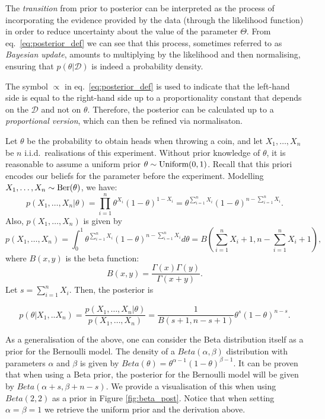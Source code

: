 The \emph{transition} from prior to posterior can be interpreted as the process of incorporating the evidence provided by the data (through the likelihood function) in order to reduce uncertainty about the value of the parameter $\Theta$. From  eq.~\eqref{eq:posterior_def} we can see that this process, sometimes referred to as \emph{Bayesian update}, amounts to multiplying by the likelihood and then normalising, ensuring that $p(\theta|\mathcal{D})$ is indeed a probability density.

\begin{remark}
The symbol $\propto$ in eq.~\eqref{eq:posterior_def} is used to indicate that the left-hand side is equal to the right-hand side up to a proportionality constant that depends on the $\mathcal{D}$ and not on $\theta$. Therefore, the posterior can be calculated up to a \emph{proportional version}, which can then be refined via normalisaton.
\end{remark}

\begin{example}
\label{ej_post_bernoulli_1}
Let $\theta$ be the probability to obtain heads when throwing a coin, and let $X_1,\ldots, X_n$ be $n$ i.i.d.~realisations of this experiment. Without prior knowledge of $\theta$, it is reasonable to assume a uniform prior $\theta \sim \text{Uniform}(0,1)$. Recall that this priori encodes our beliefs for the parameter before the experiment. Modelling $X_1,\ldots,X_n \sim \text{Ber}(\theta)$, we have: 
$$
p(X_1,\ldots,X_n|\theta)=\prod_{i=1}^{n} \theta^{X_i} (1-\theta)^{1-X_i} = 
\theta^{\sum_{i=1}^{n} X_i} (1-\theta)^{n-\sum_{i=1}^{n}X_i}.
$$Also, $p(X_1,\ldots,X_n)$ is given by 
$$
p(X_1,\ldots,X_n)=\int_{0}^{1} \theta^{\sum_{i=1}^{n} X_i} (1-\theta)^{n-\sum_{i=1}^{n}X_i} d\theta = B\left(\sum_{i=1}^{n} X_i +1 , n- \sum_{i=1}^{n} X_i +1 \right),
$$
where $B(x,y)$ is the beta function:
$$
B(x,y)=\dfrac{\Gamma(x)\Gamma(y)}{\Gamma(x+y)}.
$$
Let $s= \sum_{i=1}^{n}X_i$. Then, the posterior is

$$
p(\theta|X_1,..X_n)= \dfrac{p(X_1,\ldots,X_n|\theta)}{p(X_1,\ldots,X_n)} = \dfrac{1}{B(s+1,n-s+1)} \theta^{s} (1-\theta)^{n-s}.
$$

As a generalisation of the above, one can consider the Beta distribution itself as a  prior for the Bernoulli model. The density of a $Beta(\alpha,\beta)$ distribution with parameters $\alpha$ and $\beta$ is given by $Beta(\theta) = \theta^{\alpha-1} (1-\theta)^{\beta-1}$. It can be proven that when using a Beta prior, the posterior for the Bernoulli model will be given by $Beta(\alpha+s,\beta+n-s)$. We provide a visualisation of this when using $Beta(2,2)$ as a prior in Figure \ref{fig:beta_post}. Notice that when setting $\alpha=\beta=1$ we retrieve the uniform prior and the derivation above.

\end{example} 


